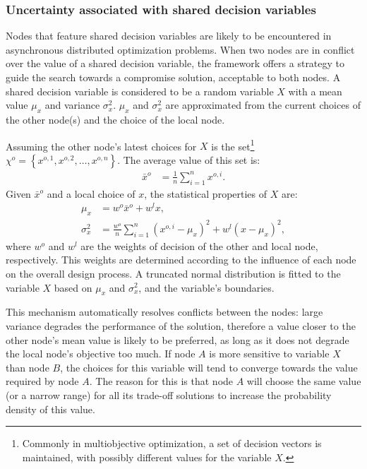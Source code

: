 \documentclass[a4paper]{article}
\newcommand{\brr}[1]{{\left({#1}\right)}} %
\newcommand{\brf}[1]{\left\lbrace{#1}\right\rbrace} %
\begin{document}
\subsubsection{Uncertainty associated with shared decision variables}
\label{subsec:Shared Decision Variables}
Nodes that feature shared decision variables are likely to be encountered in asynchronous distributed optimization problems. When two nodes are in conflict over the value of a shared decision variable, the framework offers a strategy to guide the search towards a compromise solution, acceptable to both nodes. A shared decision variable is considered to be a random variable $X$ with a mean value $\mu_x$ and variance $\sigma^2_x$. $\mu_x$ and $\sigma^2_x$ are approximated from the current choices of the other node(s) and the choice of the local node.

Assuming the other node's latest choices for $X$ is the set\footnote{Commonly in multiobjective optimization, a set of decision vectors is maintained, with possibly different values for the variable $X$.} $\chi^o=\brf{x^{o,1}, x^{o,2},\ldots,x^{o,n}}$. The average value of this set is:
\begin{align}
	\bar{x}^o &= \frac{1}{n}\sum_{i=1}^n x^{o,i}.
\end{align}
Given $\bar{x}^o$ and a local choice of $x$, the statistical properties of $X$ are:
\begin{align}
	\mu_x &= w^o \bar{x}^o + w^l x,\\
	\sigma^2_x &= \frac{w^o}{n}\sum_{i=1}^n \brr{x^{o,i}-\mu_x}^2 + w^l\brr{x-\mu_x}^2,
\end{align}
where $w^o$ and $w^l$ are the weights of decision of the other and local node, respectively. This weights are determined according to the influence of each node on the overall design process. A truncated normal distribution is fitted to the variable $X$ based on $\mu_x$ and $\sigma^2_x$, and the variable's boundaries.

This mechanism automatically resolves conflicts between the nodes: large variance degrades the performance of the solution, therefore a value closer to the other node's mean value is likely to be preferred, as long as it does not degrade the local node's objective too much. If node $A$ is more sensitive to variable $X$ than node $B$, the choices for this variable will tend to converge towards the value required by node $A$. The reason for this is that node $A$ will choose the same value (or a narrow range) for all its trade-off solutions to increase the probability density of this value.
\end{document}
